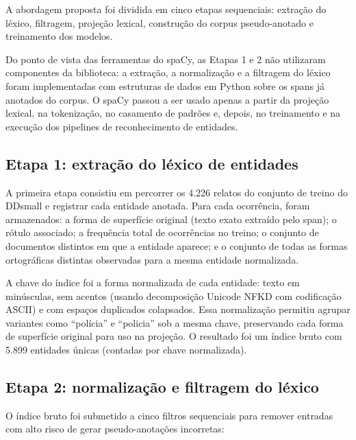\documentclass[12pt,a4paper]{article}
\begin{document}
A abordagem proposta foi dividida em cinco etapas sequenciais: extração do léxico,
filtragem, projeção lexical, construção do corpus pseudo-anotado e treinamento
dos modelos.

Do ponto de vista das ferramentas do spaCy, as Etapas 1 e 2 não utilizaram
componentes da biblioteca: a extração, a normalização e a filtragem do léxico
foram implementadas com estruturas de dados em Python sobre os spans já
anotados do corpus. O spaCy passou a ser usado apenas a partir da projeção
lexical, na tokenização, no casamento de padrões e, depois, no treinamento e
na execução dos pipelines de reconhecimento de entidades.

\subsection{Etapa 1: extração do léxico de entidades}

A primeira etapa consistiu em percorrer os 4.226 relatos do conjunto de treino
do DDsmall e registrar cada entidade anotada. Para cada ocorrência, foram
armazenados: a forma de superfície original (texto exato extraído pelo span); o
rótulo associado; a frequência total de ocorrências no treino; o conjunto de
documentos distintos em que a entidade aparece; e o conjunto de todas as formas
ortográficas distintas observadas para a mesma entidade normalizada.

A chave do índice foi a forma normalizada de cada entidade: texto em minúsculas,
sem acentos (usando decomposição Unicode NFKD com codificação ASCII) e com espaços
duplicados colapsados. Essa normalização permitiu agrupar variantes como
``polícia'' e ``policia'' sob a mesma chave, preservando cada forma de superfície
original para uso na projeção. O resultado foi um índice bruto com 5.899 entidades
únicas (contadas por chave normalizada).

\subsection{Etapa 2: normalização e filtragem do léxico}

O índice bruto foi submetido a cinco filtros sequenciais para remover entradas
com alto risco de gerar pseudo-anotações incorretas:
\end{document}
